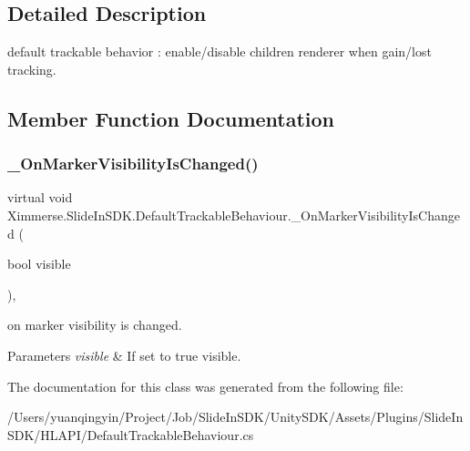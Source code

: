 \subsection{Detailed Description}
default trackable behavior \+: enable/disable children renderer when gain/lost tracking. 



\subsection{Member Function Documentation}
\mbox{\label{class_ximmerse_1_1_slide_in_s_d_k_1_1_default_trackable_behaviour_afeb5308ac6e873395cfeced2903f0547}} 
\subsubsection{\texorpdfstring{\+\_\+\+On\+Marker\+Visibility\+Is\+Changed()}{\_OnMarkerVisibilityIsChanged()}}
{\footnotesize\ttfamily virtual void Ximmerse.\+Slide\+In\+S\+D\+K.\+Default\+Trackable\+Behaviour.\+\_\+\+On\+Marker\+Visibility\+Is\+Changed (\begin{DoxyParamCaption}\item[{bool}]{visible }\end{DoxyParamCaption})\hspace{0.3cm}{\ttfamily [protected]}, {\ttfamily [virtual]}}



on marker visibility is changed. 


\begin{DoxyParams}{Parameters}
{\em visible} & If set to {\ttfamily true} visible.\\
\hline
\end{DoxyParams}


The documentation for this class was generated from the following file\+:\begin{DoxyCompactItemize}
\item 
/\+Users/yuanqingyin/\+Project/\+Job/\+Slide\+In\+S\+D\+K/\+Unity\+S\+D\+K/\+Assets/\+Plugins/\+Slide\+In\+S\+D\+K/\+H\+L\+A\+P\+I/Default\+Trackable\+Behaviour.\+cs\end{DoxyCompactItemize}
